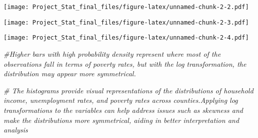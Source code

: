 \documentclass[
]{article}
\newenvironment{Shaded}{\begin{snugshade}}{\end{snugshade}}
\newcommand{\AttributeTok}[1]{\textcolor[rgb]{0.13,0.29,0.53}{#1}}
\newcommand{\CommentTok}[1]{\textcolor[rgb]{0.56,0.35,0.01}{\textit{#1}}}
\newcommand{\FunctionTok}[1]{\textcolor[rgb]{0.13,0.29,0.53}{\textbf{#1}}}
\newcommand{\NormalTok}[1]{#1}
\newcommand{\SpecialCharTok}[1]{\textcolor[rgb]{0.81,0.36,0.00}{\textbf{#1}}}
\begin{document}
\texttt{[image: Project\_Stat\_final\_files/figure-latex/unnamed-chunk-2-2.pdf]}

\begin{Shaded}
\end{Shaded}

\texttt{[image: Project\_Stat\_final\_files/figure-latex/unnamed-chunk-2-3.pdf]}

\begin{Shaded}
\end{Shaded}

\texttt{[image: Project\_Stat\_final\_files/figure-latex/unnamed-chunk-2-4.pdf]}

\begin{Shaded}
\begin{Highlighting}[]
\CommentTok{\#Higher bars with high probability density represent where most of the observations fall in terms of poverty rates, but with the log transformation, the distribution may appear more symmetrical.}



\CommentTok{\# The histograms provide visual representations of the distributions of household income, unemployment rates, and poverty rates across counties.Applying log transformations to the variables can help address issues such as skewness and make the distributions more symmetrical, aiding in better interpretation and analysis}
\end{Highlighting}
\end{Shaded}
\end{document}

